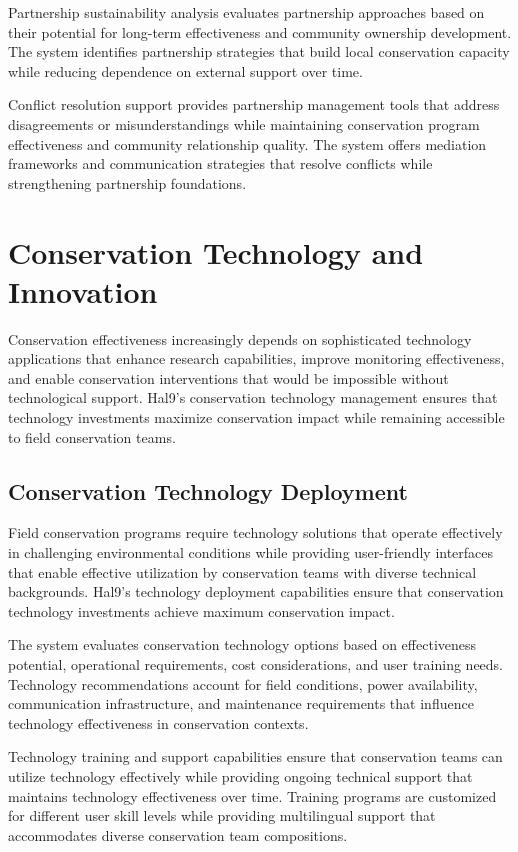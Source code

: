 \documentclass[
  Letterpaper,
]{scrbook}
\begin{document}
Partnership sustainability analysis evaluates partnership approaches
based on their potential for long-term effectiveness and community
ownership development. The system identifies partnership strategies that
build local conservation capacity while reducing dependence on external
support over time.

Conflict resolution support provides partnership management tools that
address disagreements or misunderstandings while maintaining
conservation program effectiveness and community relationship quality.
The system offers mediation frameworks and communication strategies that
resolve conflicts while strengthening partnership foundations.

\section{Conservation Technology and
Innovation}\label{conservation-technology-and-innovation}

Conservation effectiveness increasingly depends on sophisticated
technology applications that enhance research capabilities, improve
monitoring effectiveness, and enable conservation interventions that
would be impossible without technological support. Hal9's conservation
technology management ensures that technology investments maximize
conservation impact while remaining accessible to field conservation
teams.

\subsection{Conservation Technology
Deployment}\label{conservation-technology-deployment}

Field conservation programs require technology solutions that operate
effectively in challenging environmental conditions while providing
user-friendly interfaces that enable effective utilization by
conservation teams with diverse technical backgrounds. Hal9's technology
deployment capabilities ensure that conservation technology investments
achieve maximum conservation impact.

The system evaluates conservation technology options based on
effectiveness potential, operational requirements, cost considerations,
and user training needs. Technology recommendations account for field
conditions, power availability, communication infrastructure, and
maintenance requirements that influence technology effectiveness in
conservation contexts.

Technology training and support capabilities ensure that conservation
teams can utilize technology effectively while providing ongoing
technical support that maintains technology effectiveness over time.
Training programs are customized for different user skill levels while
providing multilingual support that accommodates diverse conservation
team compositions.
\end{document}
